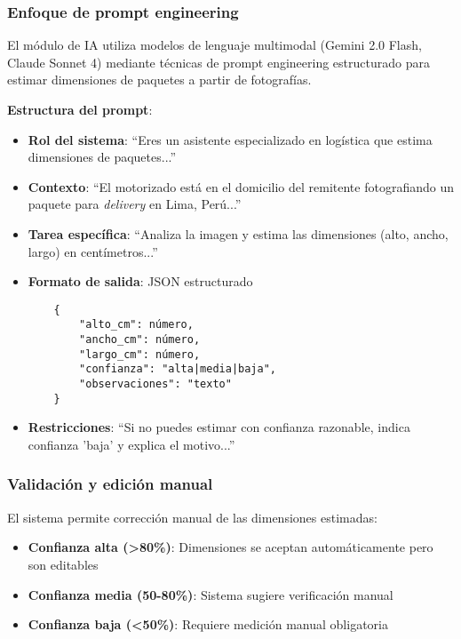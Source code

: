 \subsubsection{Enfoque de prompt engineering}

El módulo de IA utiliza modelos de lenguaje multimodal (Gemini 2.0 Flash, Claude Sonnet 4) mediante técnicas de prompt engineering estructurado para estimar dimensiones de paquetes a partir de fotografías.

\textbf{Estructura del prompt}:

\begin{itemize}
    \item \textbf{Rol del sistema}: ``Eres un asistente especializado en logística que estima dimensiones de paquetes...''
    
    \item \textbf{Contexto}: ``El motorizado está en el domicilio del remitente fotografiando un paquete para \textit{delivery} en Lima, Perú...''
    
    \item \textbf{Tarea específica}: ``Analiza la imagen y estima las dimensiones (alto, ancho, largo) en centímetros...''
    
    \item \textbf{Formato de salida}: JSON estructurado
    \begin{verbatim}
    {
        "alto_cm": número,
        "ancho_cm": número,
        "largo_cm": número,
        "confianza": "alta|media|baja",
        "observaciones": "texto"
    }
    \end{verbatim}
    
    \item \textbf{Restricciones}: ``Si no puedes estimar con confianza razonable, indica confianza 'baja' y explica el motivo...''
\end{itemize}

\subsubsection{Validación y edición manual}

El sistema permite corrección manual de las dimensiones estimadas:

\begin{itemize}
    \item \textbf{Confianza alta (>80\%)}: Dimensiones se aceptan automáticamente pero son editables
    \item \textbf{Confianza media (50-80\%)}: Sistema sugiere verificación manual
    \item \textbf{Confianza baja (<50\%)}: Requiere medición manual obligatoria
\end{itemize}

